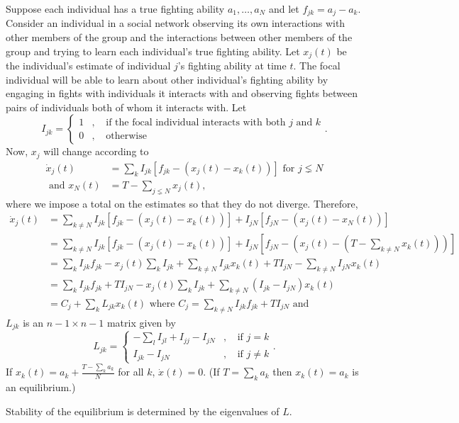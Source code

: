 \documentclass{article}
\begin{document}
Suppose each individual has a true fighting ability $a_1,\dots,a_N$ and let $f_{jk}=a_j-a_k$.  Consider an individual in a social network observing its own interactions with other members of the group and the interactions between other members of the group and trying to learn each individual's true fighting ability.  Let $x_j(t)$ be the individual's estimate of individual $j$'s fighting ability at time $t$.  The focal individual will be able to learn about other individual's fighting ability by engaging in fights with individuals it interacts with and observing fights between pairs of individuals both of whom it interacts with.  Let 
$$I_{jk}=\left\{
\begin{array}{cccc}
1 & , & \text{ if the focal individual interacts with both $j$ and $k$}\\
0 & , & \text{ otherwise}
\end{array}\right..
$$
Now, $x_j$ will change according to
\begin{align*}
\dot{x}_j(t)&=\sum_kI_{jk}\left[f_{jk}-(x_j(t)-x_k(t))\right] \text{ for } j\lneq N
\\ \text{ and } x_N(t)&=T-\sum_{j\lneq N}x_j(t),
\end{align*}
where we impose a total on the estimates so that they do not diverge.  Therefore,
\begin{align*}
\dot{x}_j(t)&=\sum_{k\neq N}I_{jk}\left[f_{jk}-(x_j(t)-x_k(t))\right]+I_{jN}\left[f_{jN}-(x_j(t)-x_N(t))\right]
\\&=\sum_{k\neq N}I_{jk}\left[f_{jk}-(x_j(t)-x_k(t))\right]+I_{jN}\left[f_{jN}-(x_j(t)-(T-\sum_{k\neq N}x_k(t)))\right]
\\&=\sum_kI_{jk}f_{jk}-x_j(t)\sum_{k}I_{jk}+\sum_{k\neq N}I_{jk}x_k(t)+TI_{jN}-\sum_{k\neq N}I_{jN}x_k(t)
\\&=\sum_kI_{jk}f_{jk}+TI_{jN}-x_j(t)\sum_kI_{jk}+\sum_{k\neq N}(I_{jk}-I_{jN})x_k(t)
\\&=C_j+\sum_{k}L_{jk}x_k(t) \text{ where } C_j=\sum_{k\neq N}I_{jk}f_{jk}+TI_{jN} \text{ and } 
\end{align*}
$L_{jk}$  is an $n-1\times n-1$ matrix given by
$$
L_{jk}=\left\{
\begin{array}{cccc}
-\sum_lI_{jl}+I_{jj}-I_{jN} & , & \text{ if }j=k
\\ I_{jk}-I_{jN} & , & \text{ if } j\neq k
\end{array}\right..
$$
If $x_k(t)=a_k+\frac{T-\sum_ka_k}{N}$  for all $k$, $\dot{x}(t)=0$.  (If $T=\sum_ka_k$ then $x_k(t)=a_k$ is an equilibrium.)

Stability of the equilibrium is determined by the eigenvalues of $L$.
\end{document}
